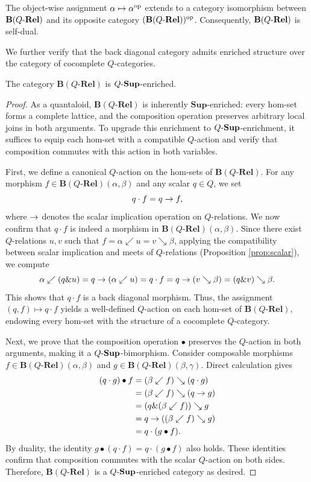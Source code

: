 \documentclass{tac}
\begin{document}
\begin{proposition}
The object-wise assignment $\alpha\mapsto\alpha^{\mathrm{op}}$ extends to a category isomorphism between ${\mathbf{B}(Q\text{-}\mathbf{Rel})}$ and its opposite category $({\mathbf{B}(Q\text{-}\mathbf{Rel})})^{\mathrm{op}}$. Consequently, ${\mathbf{B}(Q\text{-}\mathbf{Rel})}$ is self-dual.
\end{proposition}

We further verify that the back diagonal category admits enriched structure over the category of cocomplete $Q$-categories.

\begin{proposition} \label{prop:b-enriched}
The category $\mathbf{B}(Q\text{-}\mathbf{Rel})$ is ${Q\text{-}\mathbf{Sup}}$-enriched.
\end{proposition}

\begin{proof}
As a quantaloid, $\mathbf{B}(Q\text{-}\mathbf{Rel})$ is inherently $\mathbf{Sup}$-enriched: every hom-set forms a complete lattice, and the composition operation preserves arbitrary local joins in both arguments. To upgrade this enrichment to ${Q\text{-}\mathbf{Sup}}$-enrichment, it suffices to equip each hom-set with a compatible $Q$-action and verify that composition commutes with this action in both variables.

First, we define a canonical $Q$-action on the hom-sets of $\mathbf{B}(Q\text{-}\mathbf{Rel})$. For any morphism $f\in\mathbf{B}(Q\text{-}\mathbf{Rel})(\alpha,\beta)$ and any scalar $q\in Q$, we set
\[
q\cdot f=q\rightarrow f,
\]
where $\rightarrow$ denotes the scalar implication operation on $Q$-relations. We now confirm that $q\cdot f$ is indeed a morphism in $\mathbf{B}(Q\text{-}\mathbf{Rel})(\alpha,\beta)$. Since there exist $Q$-relations $u,v$ such that $f=\alpha\swarrow u=v\searrow\beta$, applying the compatibility between scalar implication and meets of $Q$-relations (Proposition \ref{prop:scalar}), we compute
\[
\alpha\swarrow(q\& u)=q\rightarrow(\alpha\swarrow u)=q\cdot f
=q\rightarrow(v\searrow\beta)=(q\& v)\searrow\beta.
\]
This shows that $q\cdot f$ is a back diagonal morphism. Thus, the assignment $(q,f)\mapsto q\cdot f$ yields a well-defined $Q$-action on each hom-set of $\mathbf{B}(Q\text{-}\mathbf{Rel})$, endowing every hom-set with the structure of a cocomplete $Q$-category.

Next, we prove that the composition operation $\bullet$ preserves the $Q$-action in both arguments, making it a ${Q\text{-}\mathbf{Sup}}$-bimorphism. Consider composable morphisms $f\in\mathbf{B}(Q\text{-}\mathbf{Rel})(\alpha,\beta)$ and $g\in\mathbf{B}(Q\text{-}\mathbf{Rel})(\beta,\gamma)$. Direct calculation gives
\[
\begin{aligned}
(q\cdot g)\bullet f
&=(\beta\swarrow f)\searrow(q\cdot g)\\
&=(\beta\swarrow f)\searrow(q\rightarrow g)\\
&=(q\&(\beta\swarrow f))\searrow g\\
&=q\rightarrow((\beta\swarrow f)\searrow g)\\
&=q\cdot(g\bullet f).
\end{aligned}
\]
By duality, the identity $g\bullet(q\cdot f)=q\cdot(g\bullet f)$ also holds. These identities confirm that composition commutes with the scalar $Q$-action on both sides. Therefore, $\mathbf{B}(Q\text{-}\mathbf{Rel})$ is a ${Q\text{-}\mathbf{Sup}}$-enriched category as desired.
\end{proof}
\end{document}
